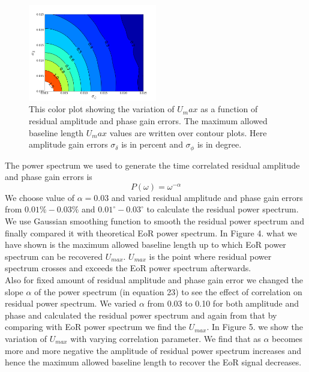 \documentclass[fleqn,usenatbib]{mnras}
\begin{document}
\begin{figure}
    \centering
    \includegraphics[width=0.5\textwidth]{SigDelvsSigPhi_Ucolor.png}
    \caption{This color plot showing the variation of $U_max$ as a function of residual amplitude and phase gain errors. The maximum allowed baseline length $U_max$ values are written over contour plots. Here amplitude gain errors $\sigma_{\delta}$ is in percent and $\sigma_{\phi}$ is in degree.}
    \label{fig:my_label}
\end{figure}
The power spectrum we used to generate the time correlated residual amplitude and phase gain errors is 
\begin{equation}
    P(\omega) = \omega ^{-\alpha}
\end{equation}
We choose value of $\alpha = 0.03$ and varied residual amplitude and phase gain errors from $0.01 \% - 0.03 \%$ and $0.01^{\circ} - 0.03^{\circ}$ to calculate the residual power spectrum. We use Gaussian smoothing function to smooth the residual power spectrum and finally compared it with theoretical EoR power spectrum. In Figure 4. what we have shown is the maximum allowed baseline length up to which EoR power spectrum can be recovered $U_{max}$. $U_{max}$ is the point where residual power spectrum crosses and exceeds the EoR power spectrum afterwards. \\
Also for fixed amount of residual amplitude and phase gain error we changed the slope $\alpha$ of the power spectrum (in equation 23) to see the effect of correlation on residual power spectrum. We varied $\alpha$ from 0.03 to 0.10 for both amplitude and phase and calculated the residual power spectrum and again from that by comparing with EoR power spectrum we find the $U_{max}$. In Figure 5. we show the variation of $U_{max}$ with varying correlation parameter. We find that as $\alpha$ becomes more and more negative the amplitude of residual power spectrum increases and hence the maximum allowed baseline length to recover the EoR signal decreases.
\end{document}
